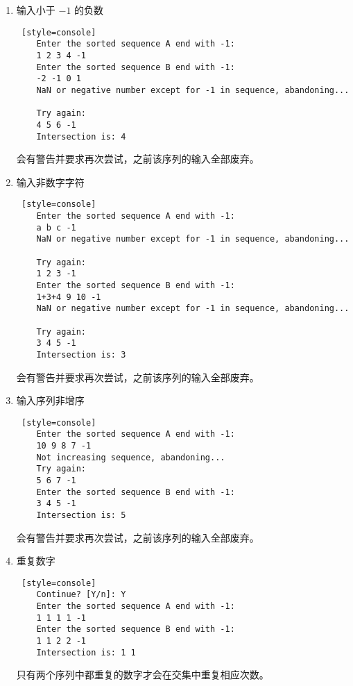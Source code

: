 \begin{enumerate}

    \item 输入小于 $-1$ 的负数
\begin{lstlisting} [style=console]
    Enter the sorted sequence A end with -1: 
    1 2 3 4 -1
    Enter the sorted sequence B end with -1: 
    -2 -1 0 1
    NaN or negative number except for -1 in sequence, abandoning...
    
    Try again: 
    4 5 6 -1
    Intersection is: 4 
\end{lstlisting}
    会有警告并要求再次尝试，之前该序列的输入全部废弃。

    \item 输入非数字字符
\begin{lstlisting} [style=console]
    Enter the sorted sequence A end with -1: 
    a b c -1
    NaN or negative number except for -1 in sequence, abandoning...
    
    Try again: 
    1 2 3 -1
    Enter the sorted sequence B end with -1: 
    1+3+4 9 10 -1
    NaN or negative number except for -1 in sequence, abandoning...
    
    Try again: 
    3 4 5 -1
    Intersection is: 3 
\end{lstlisting}
会有警告并要求再次尝试，之前该序列的输入全部废弃。

    \item 输入序列非增序
\begin{lstlisting} [style=console]
    Enter the sorted sequence A end with -1: 
    10 9 8 7 -1
    Not increasing sequence, abandoning...
    Try again: 
    5 6 7 -1
    Enter the sorted sequence B end with -1: 
    3 4 5 -1
    Intersection is: 5 
\end{lstlisting}
会有警告并要求再次尝试，之前该序列的输入全部废弃。

\item 重复数字
\begin{lstlisting} [style=console]
    Continue? [Y/n]: Y
    Enter the sorted sequence A end with -1: 
    1 1 1 1 -1
    Enter the sorted sequence B end with -1: 
    1 1 2 2 -1
    Intersection is: 1 1 
\end{lstlisting}
    只有两个序列中都重复的数字才会在交集中重复相应次数。

\end{enumerate}